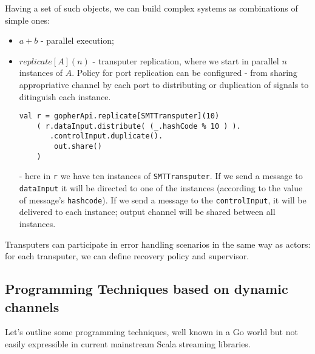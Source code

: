 \documentclass[12pt]{article}
\begin{document}
  Having a set of such objects, we can build complex systems as combinations of simple ones:
  \begin{itemize}
    \item $a+b$ - parallel execution; 
    \item $replicate[A](n)$ - transputer replication, where we start in parallel $n$ instances
  of $A$. Policy for port replication can be configured - from sharing appropriative channel by each port to distributing   or duplication of signals to ditinguish each instance.
\begin{Verbatim}[fontsize=\small]
 val r = gopherApi.replicate[SMTTransputer](10)
    ( r.dataInput.distribute( (_.hashCode % 10 ) ).
       .controlInput.duplicate().
        out.share()
    )
\end{Verbatim}
    - here in \verb|r| we have ten instances of \verb|SMTTransputer|. If we send a message to \verb|dataInput| it will be directed to one of the instances (according to the value of message's \verb|hashcode|). If we send a message to the \verb|controlInput|, it will be delivered to each instance; output channel will be shared between all instances.
  \end{itemize}

  Transputers can participate in error handling scenarios in the same way as actors: for each transputer, we can define recovery policy and supervisor.

\subsection{ Programming Techniques based on dynamic channels  }

 Let's outline some programming techniques, well known in a Go world but not easily expressible in current mainstream Scala streaming libraries. 
\end{document}
